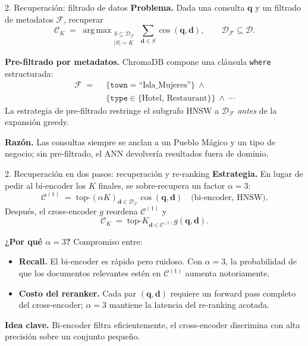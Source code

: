 \documentclass[10pt,aspectratio=169]{beamer}
\newcommand{\vq}{\mathbf{q}}
\newcommand{\vd}{\mathbf{d}}
\DeclareMathOperator*{\argmax}{arg\,max}
\begin{document}
\begin{frame}{2. Recuperación: filtrado de datos}
	\textbf{Problema.} Dada una consulta $\vq$ y un filtrado de metadatos
	$\mathcal{F}$, recuperar
	\[
		\mathcal{C}_K \;=\;
		\argmax_{\substack{S \subseteq \mathcal{D}_{\mathcal{F}} \\ |S|=K}}
		\sum_{\vd \in S} \cos(\vq,\vd),
		\qquad
		\mathcal{D}_{\mathcal{F}} \subseteq \mathcal{D}.
	\]

	\textbf{Pre-filtrado por metadatos.} ChromaDB compone una cláusula
	\texttt{where} estructurada:
	\begin{align*}
		\mathcal{F} \;=\;\  & \bigl\{ \texttt{town} = \text{``Isla\_Mujeres''} \bigr\}\
		\land                                                                                \\
		                    & \bigl\{ \texttt{type} \in \{\text{Hotel, Restaurant}\}\bigr\}\
		\land\ \cdots
	\end{align*}
	La estrategia de pre-filtrado restringe el subgrafo HNSW
	a $\mathcal{D}_{\mathcal{F}}$ \emph{antes} de la expansión greedy.

	\medskip
	\textbf{Razón.} Las consultas siempre se anclan a un Pueblo Mágico
	y un tipo de negocio; sin pre-filtrado, el ANN devolvería resultados
	fuera de dominio.
\end{frame}

\begin{frame}{2. Recuperación en dos pasos: recuperación y re-ranking}
	\textbf{Estrategia.} En lugar de pedir al bi-encoder los $K$ finales,
	se sobre-recupera un factor $\alpha = 3$:
	\[
		\mathcal{C}^{(1)} \;=\;
		\text{top-}(\alpha K)_{\vd \in \mathcal{D}_{\mathcal{F}}}
		\cos(\vq,\vd)
		\quad\text{(bi-encoder, HNSW)}.
	\]
	Después, el cross-encoder $g$ reordena $\mathcal{C}^{(1)}$ y
	\[
		\mathcal{C}_K \;=\;
		\text{top-}K_{\vd \in \mathcal{C}^{(1)}}
		g(\vq, \vd).
	\]

	\textbf{¿Por qué $\alpha=3$?} Compromiso entre:
	\begin{itemize}
		\item \textbf{Recall.} El bi-encoder es rápido pero
		      ruidoso. Con $\alpha=3$, la probabilidad de que los documentos relevantes estén
		      en $\mathcal{C}^{(1)}$ aumenta notoriamente.
		\item \textbf{Costo del reranker.} Cada par $(\vq,\vd)$ requiere un
		      forward pass completo del cross-encoder; $\alpha=3$ mantiene la
		      latencia del re-ranking acotada.
	\end{itemize}

	\medskip
	\textbf{Idea clave.} Bi-encoder filtra eficientemente,
	el cross-encoder discrimina con alta precisión sobre un conjunto pequeño.
\end{frame}
\end{document}
